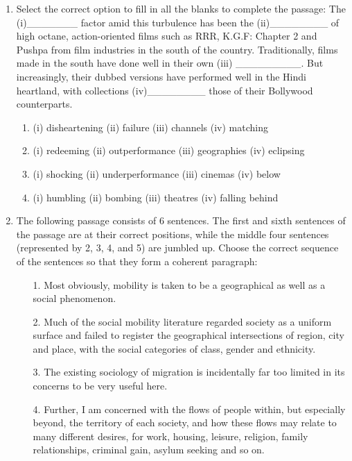\documentclass[12pt]{article}
\theoremstyle{remark}
\begin{document}
\begin{enumerate}
\begin{enumerate}
\end{enumerate}
\hfill{}
\item Select the correct option to fill in all the blanks to complete the passage:
The (i)\_\_\_\_\_\_\_ factor amid this turbulence has been the (ii)\_\_\_\_\_\_\_\_ of high
octane, action-oriented films such as RRR, K.G.F: Chapter 2 and Pushpa from film
industries in the south of the country. Traditionally, films made in the south have
done well in their own (iii) \_\_\_\_\_\_\_\_\_. But increasingly, their dubbed versions
have performed well in the Hindi heartland, with collections (iv)\_\_\_\_\_\_\_\_ those of
their Bollywood counterparts.
\begin{enumerate} 
\item (i) disheartening (ii) failure (iii) channels (iv) matching
\item (i) redeeming (ii) outperformance (iii) geographies (iv) eclipsing
\item (i) shocking (ii) underperformance (iii) cinemas (iv) below
\item (i) humbling (ii) bombing (iii) theatres (iv) falling behind
\end{enumerate}
\hfill{}
\item The following passage consists of 6 sentences. The first and sixth sentences of the
passage are at their correct positions, while the middle four sentences (represented
by 2, 3, 4, and 5) are jumbled up. Choose the correct sequence of the sentences so that they form a coherent
paragraph:
\begin{enumerate}
\item[1.] Most obviously, mobility is taken to be a geographical as well as a social phenomenon.
\item[2.] Much of the social mobility literature regarded society as a uniform surface and failed to register the geographical intersections of region, city and place, with the social categories of class, gender and ethnicity.
\item[3.] The existing sociology of migration is incidentally far too limited in its concerns to be very useful here.
\item[4.] Further, I am concerned with the flows of people within, but especially beyond, the territory of each society, and how these flows may relate to many different desires, for work, housing, leisure, religion, family relationships, criminal gain, asylum seeking and so on.

\end{enumerate}
\end{enumerate}
\end{document}
